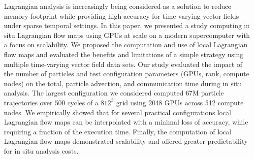 Lagrangian analysis is increasingly being considered as a solution to reduce memory footprint while providing high accuracy for time-varying vector fields under sparse temporal settings.
%
%
In this paper, we presented a study computing in situ Lagrangian flow maps using GPUs at scale on a modern supercomputer with a focus on scalability.
%
%
We proposed the computation and use of local Lagrangian flow maps and evaluated the benefits and limitations of a simple strategy using multiple time-varying vector field data sets.
%
Our study evaluated the impact of the number of particles and test configuration parameters (GPUs, rank, compute nodes) on the total, particle advection, and communication time during in situ analysis.
%
The largest configuration we considered computed 67M particle trajectories over 500 cycles of a $812^{3}$ grid using 2048 GPUs across 512 compute nodes.
%
We empirically showed that for several practical configurations local Lagrangian flow maps can be interpolated with a minimal loss of accuracy, while requiring a fraction of the execution time. 
%
Finally, the computation of local Lagrangian flow maps demonstrated scalability and offered greater predictability for in situ analysis costs.
%
